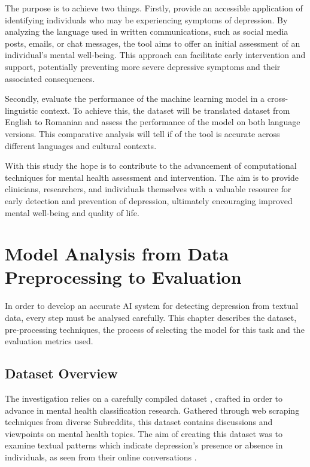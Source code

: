 \documentclass[3p,times,procedia]{elsarticle}
\begin{document}
The purpose is to achieve two things. Firstly, provide an accessible application of identifying individuals who may be experiencing symptoms of depression. By analyzing the language used in written communications, such as social media posts, emails, or chat messages, the tool aims to offer an initial assessment of an individual's mental well-being. This approach can facilitate early intervention and support, potentially preventing more severe depressive symptoms and their associated consequences.

Secondly, evaluate the performance of the machine learning model in a cross-linguistic context. To achieve this, the dataset will be translated dataset from English to Romanian and assess the performance of the model on both language versions. This comparative analysis will tell if of the tool is accurate across different languages and cultural contexts.

With this study the hope is to contribute to the advancement of computational techniques for mental health assessment and intervention. The aim is to provide clinicians, researchers, and individuals themselves with a valuable resource for early detection and prevention of depression, ultimately encouraging improved mental well-being and quality of life.

\section{Model Analysis from Data Preprocessing to Evaluation}

\quad In order to develop an accurate AI system for detecting depression from textual data, every step must be analysed carefully. This chapter describes the dataset, pre-processing techniques, the process of selecting the model for this task and the evaluation metrics used.

\subsection{Dataset Overview}

\quad The investigation relies on a carefully compiled dataset \cite{depressionDataset}, crafted in order to advance in mental health classification research. Gathered through web scraping techniques from diverse Subreddits, this dataset contains discussions and viewpoints on mental health topics. The aim of creating this dataset was to examine textual patterns which indicate depression's presence or absence in individuals, as seen from their online conversations .
\end{document}

